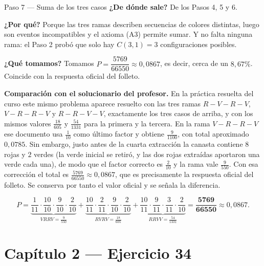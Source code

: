 \documentclass[11pt]{article}
\begin{document}
\begin{sol}
\begin{paso}{Paso 7 --- Suma de los tres casos}
\textbf{¿De d\'onde sale?} De los Pasos 4, 5 y 6.

\textbf{¿Por qu\'e?} Porque las tres ramas describen secuencias de colores distintas, luego son eventos incompatibles y el axioma (A3) permite sumar. Y no falta ninguna rama: el Paso 2 prob\'o que solo hay $C(3,1)=3$ configuraciones posibles.

\textbf{¿Qu\'e tomamos?} Tomamos $P=\dfrac{5769}{66550}\approx 0{,}0867$, es decir, cerca de un $8{,}67\%$. Coincide con la respuesta oficial del folleto.
\end{paso}

\end{sol}

\begin{nota}
\textbf{Comparaci\'on con el solucionario del profesor.} En la pr\'actica resuelta del curso este mismo problema aparece resuelto con las tres ramas $R\!-\!V\!-\!R\!-\!V$, $V\!-\!R\!-\!R\!-\!V$ y $R\!-\!R\!-\!V\!-\!V$, exactamente los tres casos de arriba, y con los mismos valores $\frac{18}{605}$ y $\frac{54}{1331}$ para la primera y la tercera. En la rama $V\!-\!R\!-\!R\!-\!V$ ese documento usa $\frac{1}{10}$ como \'ultimo factor y obtiene $\frac{9}{1100}$, con total aproximado $0{,}0785$. Sin embargo, justo antes de la cuarta extracci\'on la canasta contiene $8$ rojas y $2$ verdes (la verde inicial se retir\'o, y las dos rojas extra\'idas aportaron una verde cada una), de modo que el factor correcto es $\frac{2}{10}$ y la rama vale $\frac{9}{550}$. Con esa correcci\'on el total es $\frac{5769}{66550}\approx 0{,}0867$, que es precisamente la respuesta oficial del folleto. Se conserva por tanto el valor oficial y se se\~nala la diferencia.
\end{nota}

\begin{resp}
\[
P=\underbrace{\frac{1}{11}\cdot\frac{10}{10}\cdot\frac{9}{10}\cdot\frac{2}{10}}_{VRRV=\frac{9}{550}}
+\underbrace{\frac{10}{11}\cdot\frac{2}{11}\cdot\frac{9}{10}\cdot\frac{2}{10}}_{RVRV=\frac{18}{605}}
+\underbrace{\frac{10}{11}\cdot\frac{9}{11}\cdot\frac{3}{11}\cdot\frac{2}{10}}_{RRVV=\frac{54}{1331}}
=\mathbf{\frac{5769}{66550}}\approx 0{,}0867 .
\]
\end{resp}

\section*{Cap\'itulo 2 --- Ejercicio 34}
\end{document}
